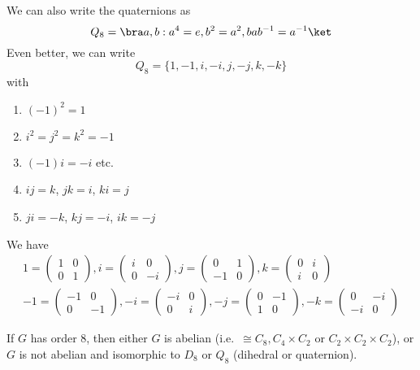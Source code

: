 \documentclass[a4paper]{article}
\begin{document}
\begin{notation}
  We can also write the quaternions as
  \[
    Q_8 = \bra a, b : a^4 = e, b^2 = a^2, bab^{-1} = a^{-1}\ket
  \]
  Even better, we can write
  \[
    Q_8 = \{1, -1, i, -i, j, -j, k, -k\}
  \]
  with
  \begin{enumerate}
    \item $(-1)^2 = 1$
    \item $i^2 = j^2 = k^2 = -1$
    \item $(-1)i = -i$ etc.
    \item $ij = k$, $jk = i$, $ki = j$
    \item $ji = -k$, $kj = -i$, $ik = -j$
  \end{enumerate}
  We have
  \begin{gather*}
    1 = \begin{pmatrix}
      1&0\\0&1
    \end{pmatrix},
    i = \begin{pmatrix}
      i & 0\\0&-i
    \end{pmatrix},
    j = \begin{pmatrix}
      0&1\\-1&0
    \end{pmatrix},
    k = \begin{pmatrix}
      0&i\\i&0
    \end{pmatrix}\\
    -1 = \begin{pmatrix}
      -1&0\\0&-1
    \end{pmatrix},
    -i = \begin{pmatrix}
      -i & 0\\0&i
    \end{pmatrix},
    -j = \begin{pmatrix}
      0&-1\\1&0
    \end{pmatrix},
    -k = \begin{pmatrix}
      0&-i\\-i&0
    \end{pmatrix}
  \end{gather*}
\end{notation}

\begin{lemma}
  If $G$ has order 8, then either $G$ is abelian (i.e.\ $\cong C_8, C_4\times C_2$ or $C_2\times C_2\times C_2$), or $G$ is not abelian and isomorphic to $D_8$ or $Q_8$ (dihedral or quaternion).
\end{lemma}
\end{document}
